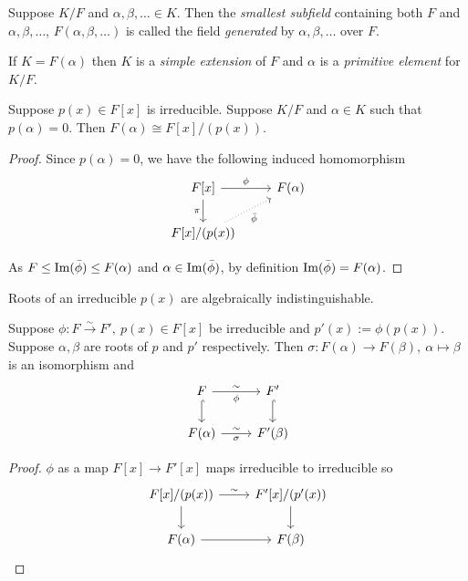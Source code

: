 \documentclass[a4paper]{article}
\begin{document}
\begin{definition}
  Suppose $K/F$ and $\alpha,\beta,\ldots \in K$. Then the \emph{smallest subfield} containing both $F$ and $\alpha,\beta,\ldots$, $F(\alpha,\beta,\ldots)$ is called the field \emph{generated} by $\alpha,\beta,\ldots$ over $F$.
\end{definition}

\begin{definition}
  If $K=F(\alpha)$ then $K$ is a \emph{simple extension} of $F$ and $\alpha$ is a \emph{primitive element} for $K/F$.
\end{definition}

\begin{proposition}
  Suppose $p(x) \in F[x]$ is irreducible. Suppose $K/F$ and $\alpha\in K$ such that $p(\alpha)=0$. Then $F(\alpha) \cong F[x]/(p(x))$.
\end{proposition}

\begin{proof}
  Since $p(\alpha)=0$, we have the following induced homomorphism
  \[
    \begin{tikzcd}
      F[x] \arrow{r}{\phi} \arrow{d}[swap]{\pi} & F(\alpha)\\
      F[x]/(p(x)) \arrow[dotted]{ru}[swap]{\bar\phi}
    \end{tikzcd}
  \]

  As $F \leq \operatorname{Im}(\bar\phi) \leq F(\alpha)$ and $\alpha\in \operatorname{Im}(\bar\phi)$, by definition $\operatorname{Im}(\bar\phi)=F(\alpha)$.
\end{proof}

\begin{remark}
  Roots of an irreducible $p(x)$ are algebraically indistinguishable.
\end{remark}

\begin{theorem}\label{thm:uniqueness of simple extension}
  Suppose $\phi: F\xrightarrow{\sim} F',\: p(x)\in F[x]$ be irreducible and $p'(x):=\phi(p(x))$. Suppose $\alpha,\beta$ are roots of $p$ and $p'$ respectively. Then $\sigma: F(\alpha) \rightarrow F(\beta),\:\alpha \mapsto \beta$ is an isomorphism and
  \[
    \begin{tikzcd}
      F \arrow{r}{\sim}[swap]{\phi} \arrow[hook]{d} & F' \arrow[hook]{d}\\
      F(\alpha) \arrow{r}{\sim}[swap]{\sigma} & F'(\beta)
    \end{tikzcd}
  \]
\end{theorem}

\begin{proof}
  $\phi$ as a map $F[x] \rightarrow F'[x]$ maps irreducible to irreducible so
  \[
    \begin{tikzcd}
      F[x]/(p(x)) \arrow{r}{\sim} \arrow{d} & F'[x]/(p'(x)) \arrow{d}\\
      F(\alpha) \arrow{r} &F(\beta)
    \end{tikzcd}
  \]
\end{proof}
\end{document}
